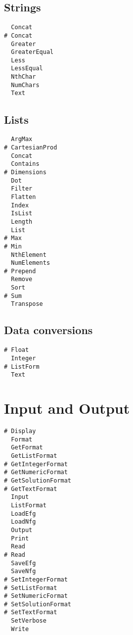 \subsection{Strings}

\begin{multicols}{3}
\begin{verbatim}
  Concat
# Concat 
  Greater
  GreaterEqual
  Less
  LessEqual
  NthChar 
  NumChars 
  Text
\end{verbatim}
\end{multicols}

\subsection{Lists}

\begin{multicols}{3}
\begin{verbatim}
  ArgMax 
# CartesianProd
  Concat 
  Contains 
# Dimensions
  Dot 
  Filter 
  Flatten 
  Index
  IsList
  Length 
  List 
# Max
# Min
  NthElement 
  NumElements 
# Prepend
  Remove 
  Sort 
# Sum 
  Transpose 
\end{verbatim}
\end{multicols}

\subsection{Data conversions}

\begin{multicols}{3}
\begin{verbatim}
# Float 
  Integer 
# ListForm 
  Text 
\end{verbatim}
\end{multicols}

\section{Input and Output}

\begin{multicols}{3}
\begin{verbatim}
# Display 
  Format
  GetFormat 
  GetListFormat 
# GetIntegerFormat 
# GetNumericFormat 
# GetSolutionFormat 
# GetTextFormat 
  Input 
  ListFormat
  LoadEfg 
  LoadNfg 
  Output 
  Print
  Read 
# Read 
  SaveEfg 
  SaveNfg 
# SetIntegerFormat 
# SetListFormat 
# SetNumericFormat 
# SetSolutionFormat 
# SetTextFormat 
  SetVerbose
  Write   
\end{verbatim}
\end{multicols}

